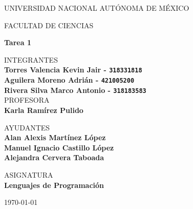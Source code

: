 \documentclass{article}
\begin{document}
	\begin{center}
	\vspace{0.8cm}
	\LARGE
	UNIVERSIDAD NACIONAL AUTÓNOMA DE MÉXICO 
	
	\vspace{0.7cm}
	\LARGE
	FACULTAD DE CIENCIAS
	
	\vspace{0.8 cm}	
	\Large
	\textbf{Tarea 1}

	\vspace{0.8 cm}
	\normalsize	
	INTEGRANTES \\
	\vspace{.2cm}
	\large
	\textbf{Torres Valencia Kevin Jair - \texttt{318331818}}\\
	\textbf{Aguilera Moreno Adrián - \texttt{421005200}}\\
	\textbf{Rivera Silva Marco Antonio - \texttt{318183583}}\\
	
	\vspace{1 cm}
	\normalsize	
	PROFESORA \\
	\vspace{.2cm}
	\large
	\textbf{Karla Ramírez Pulido}
	
	\vspace{1 cm}
	AYUDANTES \\
	\vspace{.2cm}
	\large
	\textbf{Alan Alexis Martínez López}\\
	\textbf{Manuel Ignacio Castillo López}\\
	\textbf{Alejandra Cervera Taboada}
	\vspace{1.3cm}
	
	\normalsize	
	ASIGNATURA \\
	\vspace{.2cm}
	\large
	\textbf{Lenguajes de Programación}
	
	\vspace{1 cm}
	\today
	\end{center}
	
	\newpage
	
	
    
	
	
	
	
	
	
	
	
\end{document}
